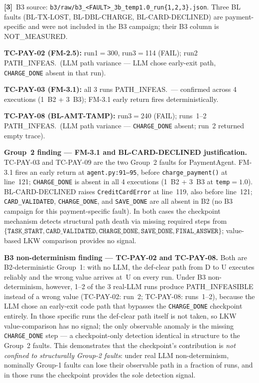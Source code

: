 \documentclass[sigconf,review,anonymous,balance=false]{acmart}
\begin{document}
\begin{table}[t]
\smallskip\par\noindent
\textbf{[3]}~B3 source: \texttt{b3/raw/b3\_<FAULT>\_3b\_temp1.0\_run\{1,2,3\}.json}.
Three BL faults (BL-TX-LOST, BL-DBL-CHARGE, BL-CARD-DECLINED) are payment-specific
and were not included in the B3 campaign; their B3 column is NOT\_MEASURED.

\par\noindent\textbf{TC-PAY-02 (FM-2.5):} run1$=$300, run3$=$114 (FAIL); run2
PATH\_INFEAS.\ (LLM path variance --- LLM chose early-exit path, \texttt{CHARGE\_DONE}
absent in that run).
\par\noindent\textbf{TC-PAY-03 (FM-3.1):} all 3 runs PATH\_INFEAS.\ --- confirmed
across 4 executions (1~B2 + 3~B3); FM-3.1 early return fires deterministically.
\par\noindent\textbf{TC-PAY-08 (BL-AMT-TAMP):} run3$=$240 (FAIL); runs~1--2
PATH\_INFEAS.\ (LLM path variance --- \texttt{CHARGE\_DONE} absent; run~2 returned
empty trace).

\smallskip\par\noindent
\textbf{Group~2 finding --- FM-3.1 and BL-CARD-DECLINED justification.}
TC-PAY-03 and TC-PAY-09 are the two Group~2 faults for PaymentAgent.
FM-3.1 fires an early return at \texttt{agent.py:91--95}, before
\texttt{charge\_payment()} at line~121; \texttt{CHARGE\_DONE} is absent in all
4 executions (1~B2 + 3~B3 at \texttt{temp}$=1.0$).
BL-CARD-DECLINED raises \texttt{CreditCardError} at line~119, also before
line~121; \texttt{CARD\_VALIDATED}, \texttt{CHARGE\_DONE}, and
\texttt{SAVE\_DONE} are all absent in B2 (no B3 campaign for this
payment-specific fault).
In both cases the checkpoint mechanism detects structural path death via missing
required steps from
$\{\texttt{TASK\_START},\allowbreak\texttt{CARD\_VALIDATED},\allowbreak%
\texttt{CHARGE\_DONE},\allowbreak\texttt{SAVE\_DONE},\allowbreak%
\texttt{FINAL\_ANSWER}\}$; value-based LKW comparison provides no signal.

\smallskip\par\noindent
\textbf{B3 non-determinism finding --- TC-PAY-02 and TC-PAY-08.}
Both are B2-deterministic Group~1: with no LLM, the def-clear path from D to U
executes reliably and the wrong value arrives at~U on every run.
Under B3 non-determinism, however, 1--2 of the 3 real-LLM runs produce
PATH\_INFEASIBLE instead of a wrong value (TC-PAY-02: run~2;
TC-PAY-08: runs~1--2), because the LLM chose an early-exit code path that
bypasses the \texttt{CHARGE\_DONE} checkpoint entirely.
In those specific runs the def-clear path itself is not taken, so LKW
value-comparison has no signal; the only observable anomaly is the
missing \texttt{CHARGE\_DONE} step --- a checkpoint-only detection identical in
structure to the Group~2 faults.
This demonstrates that the checkpoint's contribution is \emph{not confined to
structurally Group-2 faults}: under real LLM non-determinism, nominally
Group-1 faults can lose their observable path in a fraction of runs, and in
those runs the checkpoint provides the sole detection signal.
\end{table}
\end{document}

